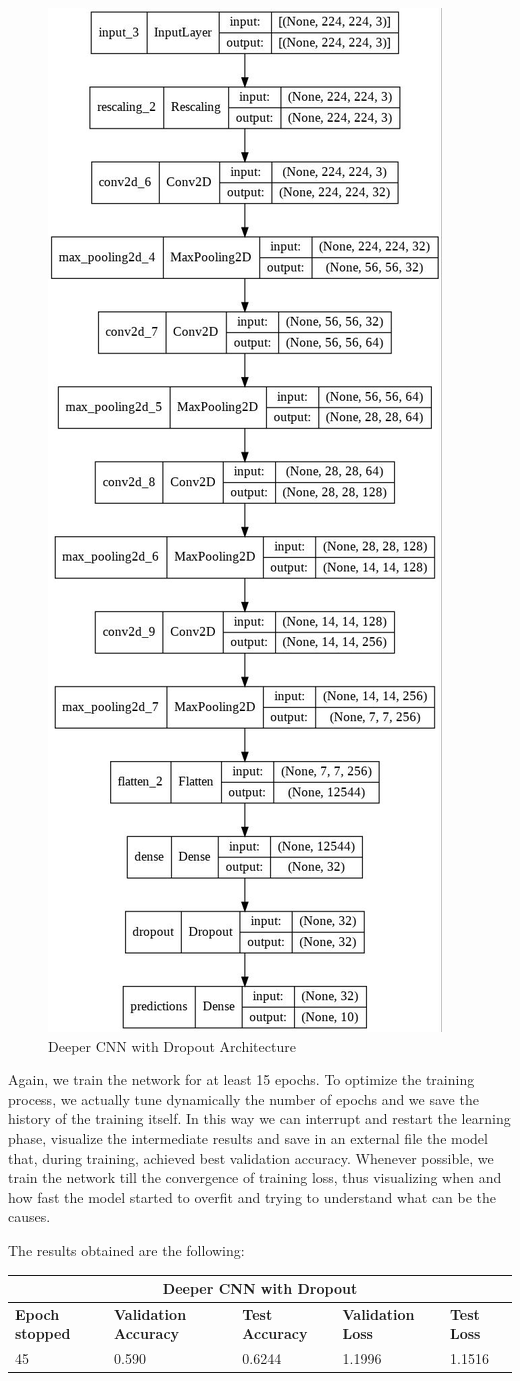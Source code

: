 \begin{figure}[H]
	\centering
	\includegraphics[height=0.8\textwidth]{img/scratch/DropoutCNN.jpg}
	\caption{Deeper CNN with Dropout Architecture}
	\label{fig: DeeperDropout}
\end{figure}

\noindent Again, we train the network for at least 15 epochs. To optimize the training process, we actually tune dynamically the number of epochs and we save the history of the training itself. In this way we can interrupt and restart the learning phase, visualize the intermediate results and save in an external file the model that, during training, achieved best validation accuracy. Whenever possible, we train the network till the convergence of training loss, thus visualizing when and how fast the model started to overfit and trying to understand what can be the causes.

\noindent The results obtained are the following:

\medskip

\begin{tabular}{ |p{2cm}|p{2cm}|p{2cm}|p{2cm}|p{2cm}|  }
\hline
\multicolumn{5}{|c|}{Deeper CNN with Dropout} \\
\hline
\textbf{Epoch stopped} & \textbf{Validation Accuracy} & \textbf{Test Accuracy} & \textbf{Validation Loss} & \textbf{Test Loss} \\
\hline
45 & 0.590 & 0.6244 & 1.1996 & 1.1516\\
\hline
\end{tabular}

